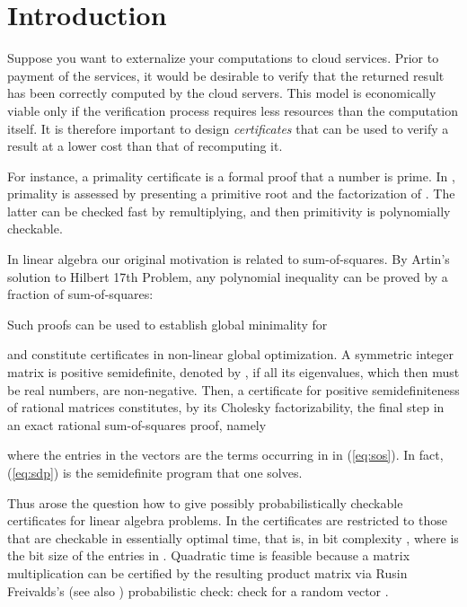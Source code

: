 \documentclass{article}
\newcommand{\category}[3]{}
\newcommand{\terms}[1]{}
\newcommand{\keywords}[1]{}
\newcommand{\sdp}{semidefinite program\xspace}
\newcommand{\psd}{positive semidefinite\xspace}
\newcommand{\psdness}{positive semidefiniteness\xspace}
\newcommand{\sos}{sum-of-squares\xspace}
\begin{document}
{\small 
  \category{I.1.2 }{Computing Methodologies}{Symbolic and Algebraic Manipulation}
  \terms{Theory, algorithms, verification}
  \keywords{Randomization, probabilistic proof, matrix rank, matrix
    characteristic polynomial, \psdness, output validation, -protocols,
    interactive certificate}
}

 
\section{Introduction}
Suppose you want to externalize your computations to
cloud services. Prior to payment of the services, it would be desirable
to verify that the returned result has been correctly computed by the cloud
servers. This model is economically viable only if the verification
process requires less resources than the computation itself.
It is therefore important to design {\em certificates} that can be
used to verify a result at a lower cost than that of recomputing it.

For instance, a primality certificate is a formal proof that a number
is prime. In \cite{Pratt:1975:primroot}, primality is assessed by
presenting a primitive root and the factorization of .
The latter can be checked fast by remultiplying, and then primitivity
is polynomially checkable.

In linear algebra our original motivation is related to \sos.
By Artin's solution to Hilbert 17th Problem, any polynomial inequality
 can be proved by a fraction of \sos: 

Such proofs can be used to establish global minimality for
 
 
and constitute certificates in non-linear global optimization. 
A symmetric integer matrix  is \psd,
denoted by , if all its eigenvalues, which then must be
real numbers, are non-negative. Then, a certificate for \psdness of rational
matrices constitutes, by its Cholesky factorizability, the final step
in an exact rational \sos proof, namely

where the entries in the vectors  are the terms occurring in 
in
(\ref{eq:sos}).
In fact, (\ref{eq:sdp}) is the \sdp that one solves.


Thus arose the question how to give possibly probabilistically checkable
certificates for linear algebra problems.
In \cite{Kaltofen:2011:quadcert} the certificates are restricted to those that
are checkable in essentially optimal time, that is, in bit complexity 
, 
where  is the bit size of the entries in {}.
Quadratic time is feasible because a matrix multiplication  can be certified
by the resulting product matrix  via Rusin Freivalds's
\cite{Freivalds:1979:certif} (see also \cite{Kimbrel:1993:PAV}) probabilistic
check: check  for a random vector {}.
\end{document}
